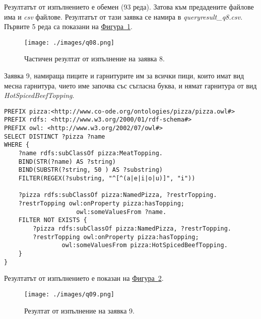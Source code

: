 \documentclass[12pt]{article}
\begin{document}
        Резултатът от изпълнението е обемен (93 реда). Затова към предадените файлове има и \textit{csv} файлове. Резултатът от тази заявка се намира в \textit{query\-result\_q8.csv}. Първите 5 реда са показани на \hyperref[fig:q08]{Фигура~\ref*{fig:q08}}.

        \begin{center}
            \begin{figure}
            \centering
                \texttt{[image: ./images/q08.png]}
                \caption{Частичен резултат от изпълнение на заявка 8.}
                \label{fig:q08}
            \end{figure}
        \end{center}
            
\clearpage
\pagebreak

        Заявка 9, намираща пиците и гарнитурите им за всички пици, които имат вид месна гарнитура, чието име започва със съгласна буква, и нямат гарнитура от вид \textit{HotSpicedBeefTopping}.
        
        \begin{lstlisting}[language=SPARQL,style=sparql]
PREFIX pizza:<http://www.co-ode.org/ontologies/pizza/pizza.owl#>
PREFIX rdfs: <http://www.w3.org/2000/01/rdf-schema#>
PREFIX owl: <http://www.w3.org/2002/07/owl#>
SELECT DISTINCT ?pizza ?name
WHERE {
    ?name rdfs:subClassOf pizza:MeatTopping.
    BIND(STR(?name) AS ?string)
    BIND(SUBSTR(?string, 50 ) AS ?substring)
    FILTER(REGEX(?substring, "^[^(a|e|i|o|u)]", "i"))
        
    ?pizza rdfs:subClassOf pizza:NamedPizza, ?restrTopping.
    ?restrTopping owl:onProperty pizza:hasTopping;
                    owl:someValuesFrom ?name.
    FILTER NOT EXISTS {
        ?pizza rdfs:subClassOf pizza:NamedPizza, ?restrTopping.
        ?restrTopping owl:onProperty pizza:hasTopping;
                owl:someValuesFrom pizza:HotSpicedBeefTopping.
    }
}\end{lstlisting}

        Резултатът от изпълнението е показан на \hyperref[fig:q09]{Фигура~\ref*{fig:q09}}.

        \begin{center}
            \begin{figure}
            \centering
                \texttt{[image: ./images/q09.png]}
                \caption{Резултат от изпълнение на заявка 9.}
                \label{fig:q09}
            \end{figure}
        \end{center}
    
\end{document}
